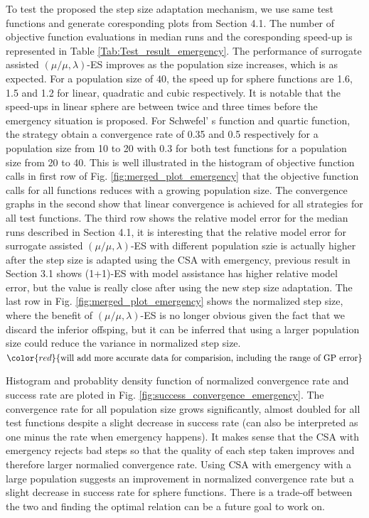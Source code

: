 To test the proposed the step size adaptation mechanism, we use same test functions and generate coresponding plots from Section 4.1. The number of objective function evaluations in median runs and the coresponding speed-up is represented in Table \ref{Tab:Test_result_emergency}. The performance of surrogate assisted $(\mu/\mu,\lambda)$-ES improves as the population size increases, which is as expected. For a population size of $40$, the speed up for sphere functions are 1.6, 1.5 and 1.2 for linear, quadratic and cubic respectively. It is notable that the speed-ups in linear sphere are between twice and three times before the emergency situation is proposed. For Schwefel' s function and quartic function, the strategy obtain a convergence rate of 0.35 and 0.5 respectively for a population size from 10 to 20 with 0.3 for both test functions for a population size from 20 to 40. This is well illustrated in the histogram of objective function calls in first row of Fig. \ref{fig:merged_plot_emergency} that the objective function calls for all functions reduces with a growing population size. The convergence graphs  in the second show that linear convergence is achieved for all strategies for all test functions. The third row shows the relative model error for the median runs described in Section 4.1, it is interesting that the relative model error for surrogate assisted $(\mu/\mu,\lambda)$-ES with different population szie is actually higher after the step size is adapted using the CSA with emergency, previous result in Section 3.1 shows (1+1)-ES with model assistance has higher relative model error, but the value is really close after using the new step size adaptation. The last row in Fig. \ref{fig:merged_plot_emergency} shows the normalized step size, where the benefit of $(\mu/\mu,\lambda)$-ES is no longer obvious given the fact that we discard the inferior offsping, but it can be inferred that using a larger population size could reduce the variance in normalized step size.
$\color{red}{\text{will add more accurate data for comparision, including the range of GP error}}$    

Histogram and probablity density function of normalized convergence rate and success rate are ploted in Fig. \ref{fig:success_convergence_emergency}. The convergence rate for all population size grows significantly, almost doubled for all test functions despite a slight decrease in success rate (can also be interpreted as one minus the rate when emergency happens). It makes sense that the CSA with emergency rejects bad steps so that the quality of each step taken improves and therefore larger normalied convergence rate. Using CSA with emergency with a large population suggests an improvement in normalized convergence rate but a slight decrease in success rate for sphere functions. There is a trade-off between the two and finding the optimal relation can be a future goal to work on.


